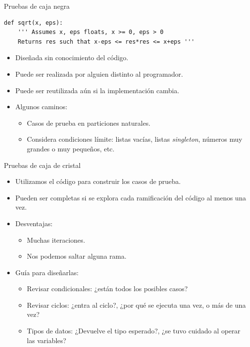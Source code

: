 \documentclass[mathserif]{beamer}
\begin{document}
\begin{frame}[fragile]{Pruebas de caja negra}
\begin{lstlisting}
def sqrt(x, eps):
    ''' Assumes x, eps floats, x >= 0, eps > 0
    Returns res such that x-eps <= res*res <= x+eps '''
\end{lstlisting}
    \begin{itemize}
        \item Diseñada {\orange sin conocimiento} del código.
        \item Puede ser realizada por alguien distinto al programador.
        \item Puede ser {\orange reutilizada} aún si la implementación cambia.
        \item Algunos caminos:
        \begin{itemize}
            \item Casos de prueba en particiones naturales.
            \item Considera {\orange condiciones límite}: listas vacías, listas \textit{singleton}, números muy grandes o muy pequeños, etc.
        \end{itemize}
    \end{itemize}
\end{frame}


\begin{frame}[fragile]{Pruebas de caja de cristal}
    \begin{itemize}
        \item Utilizamos {\orange el código} para construir los casos de prueba.
        \item Pueden ser {\orange completas} si se explora cada ramificación del código al menos una vez.
        \item Desventajas:
        \begin{itemize}
            \item Muchas iteraciones.
            \item Nos podemos saltar alguna rama.
        \end{itemize}
        
        \item Guía para diseñarlas:
        \begin{itemize}
            \item Revisar condicionales: ¿están todos los posibles casos?
            \item Revisar ciclos: ¿entra al ciclo?, ¿por qué se ejecuta una vez, o más de una vez?
            \item Tipos de datos: ¿Devuelve el tipo esperado?, ¿se tuvo cuidado al operar las variables?
        \end{itemize}
    \end{itemize}
\end{frame}
\end{document}
